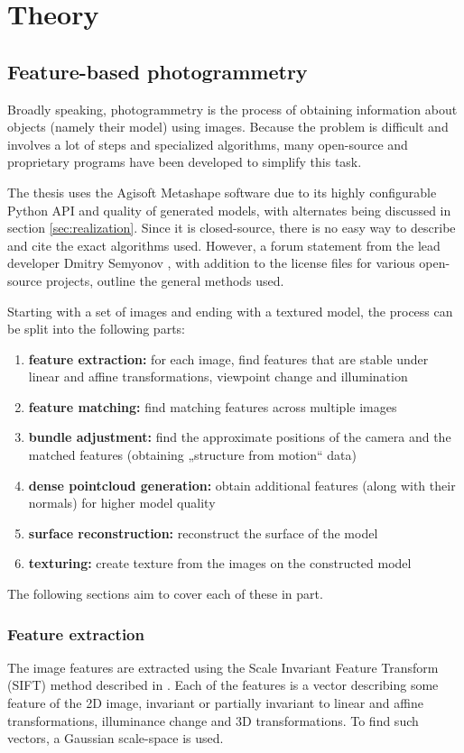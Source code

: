 \chapter{Theory}

\section{Feature-based photogrammetry}
Broadly speaking, photogrammetry is the process of obtaining information about objects (namely their model) using images.
Because the problem is difficult and involves a lot of steps and specialized algorithms, many open-source and proprietary programs have been developed to simplify this task.

The thesis uses the Agisoft Metashape software due to its highly configurable Python API and quality of generated models, with alternates being discussed in section \ref{sec:realization}.
Since it is closed-source, there is no easy way to describe and cite the exact algorithms used.
However, a forum statement from the lead developer Dmitry Semyonov \parencite{metashapeForumPost}, with addition to the license files for various open-source projects, outline the general methods used.

Starting with a set of images and ending with a textured model, the process can be split into the following parts:

\begin{enumerate}
	\item \textbf{feature extraction:} for each image, find features that are stable under linear and affine transformations, viewpoint change and illumination
	\item \textbf{feature matching:} find matching features across multiple images
	\item \textbf{bundle adjustment:} find the approximate positions of the camera and the matched features (obtaining „structure from motion“ data)
	\item \textbf{dense pointcloud generation:} obtain additional features (along with their normals) for higher model quality
	\item \textbf{surface reconstruction:} reconstruct the surface of the model
	\item \textbf{texturing:} create texture from the images on the constructed model
\end{enumerate}

The following sections aim to cover each of these in part.

\subsection{Feature extraction} \label{ch:fext}
The image features are extracted using the Scale Invariant Feature Transform (SIFT) method described in \citet{lowe1999object,lowe2004distinctive,snavely2008modeling}.
Each of the features is a vector describing some feature of the 2D image, invariant or partially invariant to linear and affine transformations, illuminance change and 3D transformations.
To find such vectors, a Gaussian scale-space is used.

